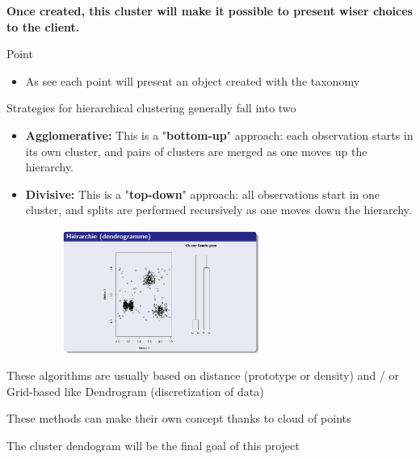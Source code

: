 \documentclass[12pt]{report}
\begin{document}
\textbf{Once created, this cluster will make it possible to present wiser choices to the client.}\par

Point  \par

\begin{itemize}
	\item As see  each point will present an object created with the taxonomy 
\end{itemize}\par

Strategies for hierarchical clustering generally fall into two \par

\begin{itemize}
	\item \textbf{Agglomerative:} This is a "\textbf{bottom-up}" approach: each observation starts in its own cluster, and pairs of clusters are merged as one moves up the hierarchy.\par

	\item \textbf{Divisive:} This is a "\textbf{top-down}" approach: all observations start in one cluster, and splits are performed recursively as one moves down the hierarchy.
\end{itemize}\par

\begin{multicols}{2}


\begin{figure}[H]
\advance\leftskip -0.18in		\includegraphics[width=3.15in,height=1.59in]{./media/image17.png}
\end{figure}


These algorithms are usually based on distance (prototype or density) and / or Grid-based like Dendrogram (discretization of data) \par
These methods can make their own concept thanks to cloud of points \par
The cluster dendogram will be the final goal of this project \par

\end{multicols}
\end{document}
